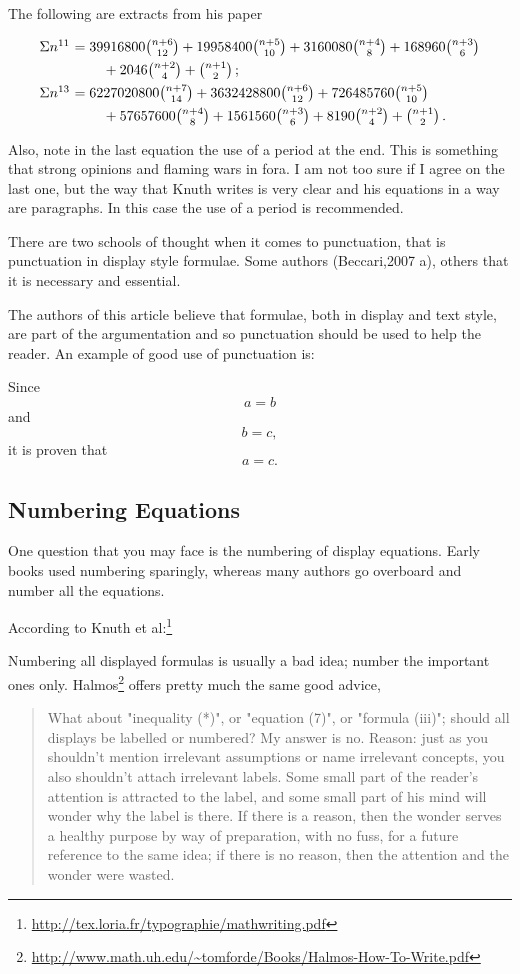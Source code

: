 {The following are extracts from his paper 

{
$$\vcenter{\halign{$#$\hfil\ &$#$\hfil\cr
\Sigma n^{11}&=39916800{n+6\choose 12}+
19958400{n+5\choose 10}+3160080{n+4\choose 8}
+168960{n+3\choose 6}\cr
\noalign{\smallskip}
&\qquad\null+2046{n+2\choose 4}+{n+1\choose 2}\,;\cr
\noalign{\smallskip}
\Sigma n^{13}&=6227020800{n+7\choose 14}+3632428800{n+6\choose 12}+
726485760{n+5\choose 10}\cr
\noalign{\smallskip}
&\qquad\null+57657600{n+4\choose 8}
+1561560{n+3\choose 6}+8190{n+2\choose 4}+{n+1\choose 2}\,.\cr}}$$
}

Also, note in the last equation the use of a period at the end. This is something that strong opinions and flaming wars in fora. I am not too sure if I agree on the last one, but the way that Knuth writes is very clear and his equations in a way are paragraphs. In this case the use of a period is recommended.



There are two schools of thought when it comes to punctuation, that is punctuation in display style formulae. Some authors (Beccari,2007 a), others that it is necessary and essential.

The authors of this article believe that formulae,
both in display and text style, are part of the argumentation
and so punctuation should be used to help
the reader. An example of good use of punctuation is:


Since
$$ a=b $$
and
$$b=c,$$
it is proven that
\[a =c. \]



\subsection{Numbering Equations}

One question that you may face is the numbering of display equations. Early books used numbering sparingly, whereas many authors go overboard and number all the equations.

According to Knuth et al:\footnote{\url{http://tex.loria.fr/typographie/mathwriting.pdf}}

Numbering all displayed formulas is usually a bad idea; number the important ones only.
Halmos\footnote{\url{http://www.math.uh.edu/~tomforde/Books/Halmos-How-To-Write.pdf}} offers pretty much the same good advice,

\begin{quotation}
What about "inequality (*)", or "equation (7)", or "formula (iii)"; should all displays be labelled or numbered? My answer is no. Reason: just as you shouldn't mention irrelevant assumptions or name irrelevant concepts, you also shouldn't attach irrelevant labels. Some small part of the reader's attention is attracted to the label, and some small part of his mind will wonder why the label is there. If there is a reason, then the wonder serves a healthy purpose by way of preparation, with no fuss, for a future reference to the same idea; if there is no reason, then the attention and the wonder were wasted.
\end{quotation}

}

